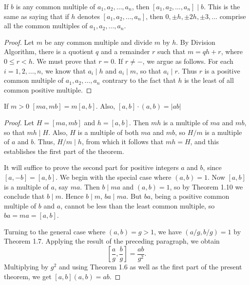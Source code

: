 \documentclass[11pt]{article}
\begin{document}
\begin{theorem}
    If \(b\) is any common multiple of \(a_1, a_2, \ldots, a_n\), then \([a_1, a_2, \ldots, a_n] \mid b\). This is the same as saying that if \(h\) denotes \([a_1, a_2, \ldots, a_n]\), then \(0, \pm h, \pm 2h, \pm 3, \ldots\) comprise all the common multiples of \(a_1, a_2, \ldots, a_n\).
\end{theorem}
\begin{proof}
    Let \(m\) be any common multiple and divide \(m\) by \(h\). By Division Algorithm, there is a quotient \(q\) and a remainder \(r\) such that \(m = qh + r\), where \(0 \leqslant r < h\). We must prove that \(r = 0\). If \(r \neq -\), we argue as follows. For each \(i = 1, 2, \ldots, n\), we know that \(a_i \mid h\) and \(a_i \mid m\), so that \(a_i \mid r\). Thus \(r\) is a positive common multiple of \(a_1, a_2, \ldots, a_n\) contrary to the fact that \(h\) is the least of all common positive multiple.
\end{proof}

\begin{theorem}
    If \(m > 0\) \([ma, mb] = m[a, b]\). Also, \([a,b] \cdot (a, b) = |ab|\)
\end{theorem}
\begin{proof}
    Let \( H = [ma, mb] \) and \( h = [a, b] \). Then \( mh \) is a multiple of \( ma \) and \( mb \), so that \( mh \mid H \). Also, \( H \) is a multiple of both \( ma \) and \( mb \), so \( H / m \) is a multiple of \( a \) and \( b \). Thus, \( H / m \mid h \), from which it follows that \( mh = H \), and this establishes the first part of the theorem.

    It will suffice to prove the second part for positive integers \( a \) and \( b
    \), since \( [a, -b] = [a, b] \). We begin with the special case where \( (a,
    b) = 1 \). Now \( [a, b] \) is a multiple of \( a \), say \( ma \). Then \( b
    \mid ma \) and \( (a, b) = 1 \), so by Theorem 1.10 we conclude that \( b \mid
    m \). Hence \( b \mid m \), \( ba \mid ma \). But \( ba \), being a positive
    common multiple of \( b \) and \( a \), cannot be less than the least common
    multiple, so \( ba = ma = [a, b] \).

    Turning to the general case where \( (a, b) = g > 1 \), we have \( (a/g, b/g) =
    1 \) by Theorem 1.7. Applying the result of the preceding paragraph, we obtain
    \[
        \left[ \frac{a}{g}, \frac{b}{g} \right] = \frac{ab}{g^2}.
    \]
    Multiplying by \( g^2 \) and using Theorem 1.6 as well as the first part of the
    present theorem, we get \( [a, b](a, b) = ab \).
\end{proof}
\end{document}
